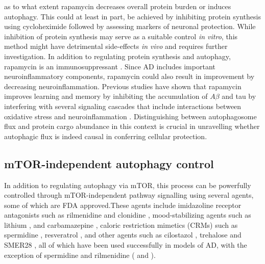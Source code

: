 as to what extent rapamycin decreases overall protein burden or induces autophagy. This could at least in part, be achieved by inhibiting protein synthesis using cycloheximide \citep{Watanabe-Asano2014} followed by assessing markers of neuronal protection. While inhibition of protein synthesis may serve as a suitable control \textit{in vitro}, this method might have detrimental side-effects \textit{in vivo} and requires further investigation. In addition to regulating protein synthesis and autophagy, rapamycin is an immunosuppressant \citep{Khanna2000,Mohacsi1992,Wicker1990}. Since AD includes important neuroinflammatory components, rapamycin could also result in improvement by decreasing neuroinflammation. Previous studies have shown that rapamycin improves learning and memory by inhibiting the accumulation of $A\beta$ and tau by interfering with several signaling cascades \citep{Liu2013,Liu2013a,Maiese2012} that include interactions between oxidative stress and neuroinflammation \citep{Agostinho2010,Galimberti2011}. Distinguishing between autophagosome flux and protein cargo abundance in this context is crucial in unravelling whether autophagic flux is indeed causal in conferring cellular protection. 

\subsection{mTOR-independent autophagy control}
In addition to regulating autophagy via mTOR, this process can be powerfully controlled through mTOR-independent pathway signalling using several agents, some of which are FDA approved.These agents include imidazoline receptor antagonists such as rilmenidine and clonidine \citep{Rose2010,Williams2008}, mood-stabilizing agents such as lithium \citep{Shimada2012,Zhang2011}, and carbamazepine \citep{Li2013,Zhang2017}, caloric restriction mimetics (CRMs) such as spermidine \citep{Buttner2014,Wang2012}, resveratrol \citep{Lee2015}, and other agents such as cilostazol \citep{Lee2015}, trehalose \citep{Rodriguez-Navarro2010,Schaeffer2012,Kruger2012} and SMER28 \citep{Tian2011}, all of which have been used successfully in models of AD, with the exception of spermidine and rilmenidine ( and ).

